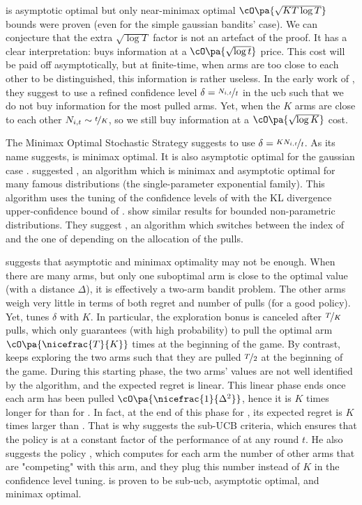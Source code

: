 {\KLUCB is asymptotic optimal but only near-minimax optimal  $\cO\pa{\sqrt{KT\log T}}$ bounds were proven (even for the simple gaussian bandits' case). We can conjecture that the extra $\sqrt{\log T}$ factor is not an artefact of the proof. It has a clear interpretation: \UCB buys information at a $\cO\pa{\sqrt{\log t}}$ price. This cost will be paid off asymptotically, but at finite-time, when arms are too close to each other to be distinguished, this information is rather useless. In the early work of \citet{lai1987adaptive}, they suggest to use a refined confidence level $\delta = \nicefrac{N_{i,t}}{t}$ in the ucb such that we do not buy information for the most pulled arms. Yet, when the $K$ arms are close to each other $N_{i,t} \sim \nicefrac{t}{K}$, so we still buy information at a $\cO\pa{\sqrt{\log K}}$ cost. 

The Minimax Optimal Stochastic Strategy \MOSS \citep{audibert2009minimax, degenne2016anytime} suggests to use $\delta = \nicefrac{K N_{i,t}}{t}$. As its name suggests, \MOSS is minimax optimal. It is also asymptotic optimal for the gaussian case \citep{lattimore2020banditbook}. \citet{menard2017klucb++} suggested \KLUCBpp, an algorithm which is minimax and asymptotic optimal for many famous distributions (the single-parameter exponential family). This algorithm uses the tuning of the confidence levels of \MOSS with the KL divergence upper-confidence bound of \KLUCB. \citet{garivier2018klucbswitch} show similar results for bounded non-parametric distributions. They suggest \KLUCBswitch, an algorithm which switches between the index of \MOSS and the one of \KLUCB depending on the allocation of the pulls.

\citet{lattimore2018refining} suggests that asymptotic and minimax optimality may not be enough. When there are many arms, but only one suboptimal arm is close to the optimal value (with a distance $\Delta$), it is effectively a two-arm bandit problem. The other arms weigh very little in terms of both regret and number of pulls (for a good policy).  Yet, \MOSS tunes $\delta$ with $K$. In particular, the exploration bonus is canceled after $\nicefrac{T}{K}$ pulls, which only guarantees (with high probability) to pull the optimal arm $\cO\pa{\nicefrac{T}{K}}$ times at the beginning of the game. By contrast, \UCB keeps exploring the two arms such that they are pulled $\nicefrac{T}{2}$ at the beginning of the game. During this starting phase, the two arms' values are not well identified by the algorithm, and the expected regret is linear. This linear phase ends once each arm has been pulled $\cO\pa{\nicefrac{1}{\Delta^2}}$, hence it is $K$ times longer for \MOSS than for \UCB. In fact, at the end of this phase for \MOSS, its expected regret is $K$ times larger than \UCB. That is why \citet{lattimore2018refining} suggests the sub-UCB criteria, which ensures that the policy is at a constant factor of the performance of \UCB at any round $t$. He also suggests the policy \ADAUCB, which computes for each arm the number of other arms that are "competing" with this arm, and they plug this number instead of $K$ in the confidence level tuning. \ADAUCB is proven to be sub-ucb, asymptotic optimal, and minimax optimal. 

}
